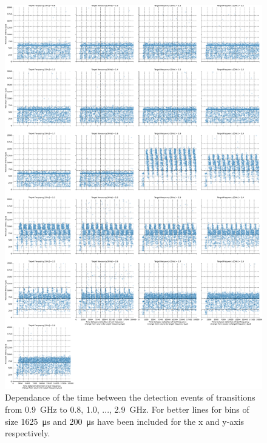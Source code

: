 \begin{figure}[]
    \centering
    \includegraphics[width=\columnwidth]{fig/ftalat_scatter_wait_transition_latency_hati_source_0.9.pdf}
    \caption{Dependance of the time between the detection events of transitions from \SI{0.9}{\GHz} to \SI{0.8}{}, \SI{1.0}{}, ..., \SI{2.9}{\GHz}. For better lines for bins of size \SI{1625}{\us} and \SI{200}{\us} have been included for the x and y-axis respectively.}
\end{figure}

